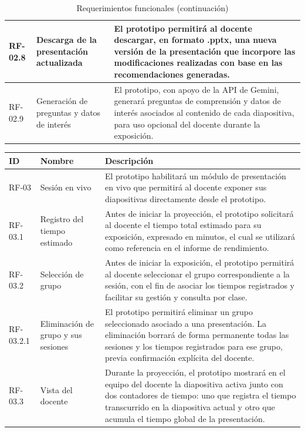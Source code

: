 \documentclass[11pt]{article}
\begin{document}
\begin{table}[H]
\begin{tabular}{|L{1.8cm}|L{4.2cm}|L{8.1cm}|}
        \hline
        RF-02.8 & Descarga de la presentación actualizada & El prototipo permitirá al docente descargar, en formato .pptx, una nueva versión de la presentación que incorpore las modificaciones realizadas con base en las recomendaciones generadas. \\
        \hline
        RF-02.9 & Generación de preguntas y datos de interés & El prototipo, con apoyo de la API de Gemini, generará preguntas de comprensión y datos de interés asociados al contenido de cada diapositiva, para uso opcional del docente durante la exposición. \\
        \hline
    \end{tabular}
    \caption{Requerimientos funcionales (continuación)}
\end{table}

\begin{table}[H]
    \centering
    \begin{tabular}{|L{1.8cm}|L{4.2cm}|L{8.1cm}|}
        \hline
        \textbf{ID} & \textbf{Nombre} & \textbf{Descripción} \\
        \hline
        RF-03 & Sesión en vivo & El prototipo habilitará un módulo de presentación en vivo que permitirá al docente exponer sus diapositivas directamente desde el prototipo. \\
        \hline
        RF-03.1 & Registro del tiempo estimado & Antes de iniciar la proyección, el prototipo solicitará al docente el tiempo total estimado para su exposición, expresado en minutos, el cual se utilizará como referencia en el informe de rendimiento. \\
        \hline
        RF-03.2 & Selección de grupo & Antes de iniciar la exposición, el prototipo permitirá al docente seleccionar el grupo correspondiente a la sesión, con el fin de asociar los tiempos registrados y facilitar su gestión y consulta por clase. \\
        \hline
        RF-03.2.1 & Eliminación de grupo y sus sesiones & El prototipo permitirá eliminar un grupo seleccionado asociado a una presentación. La eliminación borrará de forma permanente todas las sesiones y los tiempos registrados para ese grupo, previa confirmación explícita del docente. \\
        \hline
        RF-03.3 & Vista del docente & Durante la proyección, el prototipo mostrará en el equipo del docente la diapositiva activa junto con dos contadores de tiempo: uno que registra el tiempo transcurrido en la diapositiva actual y otro que acumula el tiempo global de la presentación. \\

\end{tabular}
\end{table}
\end{document}
